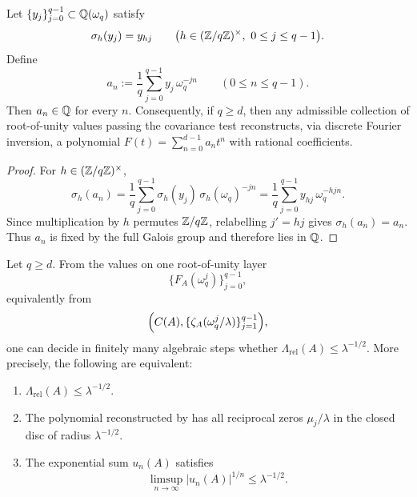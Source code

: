 \begin{corollary}
  \label{cor:finite-part-torsion-table-galois-certificate}
  Let \(\{y_j\}_{j=0}^{q-1}\subset\mathbb{Q}(\omega_q)\) satisfy
  \[
    \sigma_h(y_j)=y_{hj}
    \qquad
    \bigl(h\in(\mathbb{Z}/q\mathbb{Z})^\times,\ 0\le j\le q-1\bigr).
  \]
  Define
  \[
    a_n:=\frac{1}{q}\sum_{j=0}^{q-1}y_j\,\omega_q^{-jn}
    \qquad (0\le n\le q-1).
  \]
  Then \(a_n\in\mathbb{Q}\) for every \(n\). Consequently, if \(q\ge d\), then
  any admissible collection of root-of-unity values passing the
  covariance test reconstructs,
  via discrete Fourier inversion, a polynomial
  \(F(t)=\sum_{n=0}^{d-1}a_nt^n\) with rational coefficients.
\end{corollary}

\begin{proof}
  For \(h\in(\mathbb{Z}/q\mathbb{Z})^\times\),
  \[
    \sigma_h(a_n)
    =\frac{1}{q}\sum_{j=0}^{q-1}\sigma_h(y_j)\,
      \sigma_h(\omega_q)^{-jn}
    =\frac{1}{q}\sum_{j=0}^{q-1}y_{hj}\,\omega_q^{-hjn}.
  \]
  Since multiplication by \(h\) permutes \(\mathbb{Z}/q\mathbb{Z}\), relabelling
  \(j'=hj\) gives \(\sigma_h(a_n)=a_n\). Thus \(a_n\) is fixed by the
  full Galois group and therefore lies in \(\mathbb{Q}\).
\end{proof}

\begin{theorem}
  \label{thm:finite-part-single-layer-torsion-near-rh}
  Let \(q\ge d\). From the values on one root-of-unity layer
  \[
    \{F_A(\omega_q^j)\}_{j=0}^{q-1},
  \]
  equivalently from
  \[
    \Bigl(C(A),\{\zeta_A(\omega_q^j/\lambda)\}_{j=1}^{q-1}\Bigr),
  \]
  one can decide in finitely many algebraic steps whether
  \(\Lambda_{\mathrm{rel}}(A)\le \lambda^{-1/2}\). More precisely, the
  following are equivalent:
  \begin{enumerate}[label=\textup{(\roman*)}]
    \item \(\Lambda_{\mathrm{rel}}(A)\le \lambda^{-1/2}\).
    \item The polynomial reconstructed by
    has all reciprocal zeros \(\mu_j/\lambda\) in the closed disc of
    radius \(\lambda^{-1/2}\).
    \item The exponential sum \(u_n(A)\) satisfies
    \[
      \limsup_{n\to\infty}|u_n(A)|^{1/n}\le \lambda^{-1/2}.
    \]
  \end{enumerate}
\end{theorem}

